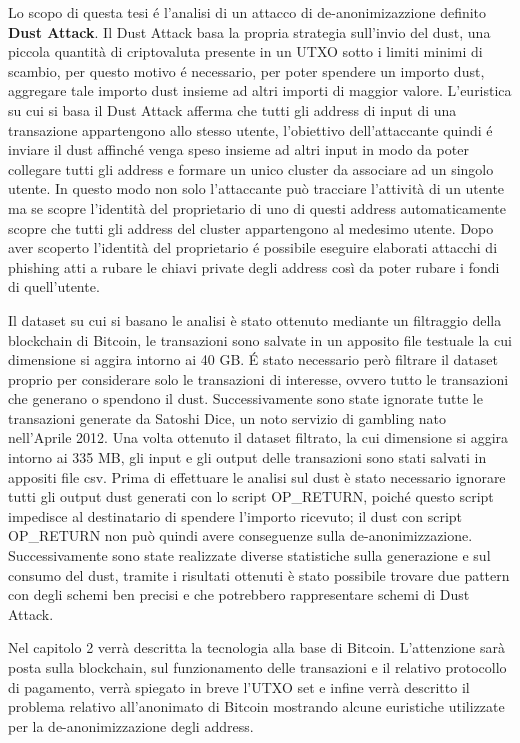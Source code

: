 Lo scopo di questa tesi é l'analisi di un attacco di de-anonimizazzione definito \textbf{Dust Attack}. Il Dust Attack basa la propria strategia sull'invio del dust, una piccola quantità di criptovaluta presente in un UTXO sotto i limiti minimi di scambio, per questo motivo é necessario, per poter spendere un importo dust, aggregare tale importo dust insieme ad altri importi di maggior valore. L'euristica su cui si basa il Dust Attack afferma che tutti gli address di input di una transazione appartengono allo stesso utente, l'obiettivo dell'attaccante quindi é inviare il dust affinché venga speso insieme ad altri input in modo da poter collegare tutti gli address e formare un unico cluster da associare ad un singolo utente. In questo modo non solo l'attaccante può tracciare l'attività di un utente ma se scopre l'identità del proprietario di uno di questi address automaticamente scopre che tutti gli address del cluster appartengono al medesimo utente. Dopo aver scoperto l'identità del proprietario é possibile eseguire elaborati attacchi di phishing atti a rubare le chiavi private degli address così da poter rubare i fondi di quell'utente.

Il dataset su cui si basano le analisi è stato ottenuto mediante un filtraggio della blockchain di Bitcoin, le transazioni sono salvate in un apposito file testuale la cui dimensione si aggira intorno ai 40 GB. É stato necessario però filtrare il dataset proprio per considerare solo le transazioni di interesse, ovvero tutto le transazioni che generano o spendono il dust. Successivamente sono state ignorate tutte le transazioni generate da Satoshi Dice, un noto servizio di gambling nato nell'Aprile 2012. Una volta ottenuto il dataset filtrato, la cui dimensione si aggira intorno ai 335 MB, gli input e gli output delle transazioni sono stati salvati in appositi file csv. Prima di effettuare le analisi sul dust è stato necessario ignorare tutti gli output dust generati con lo script OP\_RETURN, poiché questo script impedisce al destinatario di spendere l'importo ricevuto; il dust con script OP\_RETURN non può quindi avere conseguenze sulla de-anonimizzazione. Successivamente sono state realizzate diverse statistiche sulla generazione e sul consumo del dust, tramite i risultati ottenuti è stato possibile trovare due pattern con degli schemi ben precisi e che potrebbero rappresentare schemi di Dust Attack.
 
Nel capitolo 2 verrà descritta la tecnologia alla base di Bitcoin. L'attenzione sarà posta sulla blockchain, sul funzionamento delle transazioni e il relativo protocollo di pagamento, verrà spiegato in breve l'UTXO set e infine verrà descritto il problema relativo all'anonimato di Bitcoin mostrando alcune euristiche utilizzate per la de-anonimizzazione degli address.

